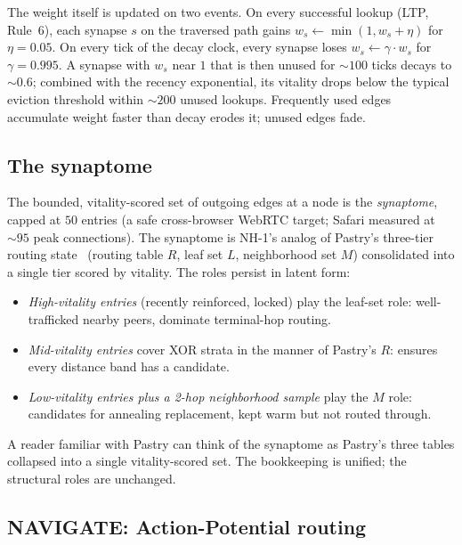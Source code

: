\documentclass[conference]{IEEEtran}
\newcommand{\nhone}{NH-1\xspace}
\begin{document}
The weight itself is updated on two events. On every successful lookup
(LTP, Rule~6), each synapse $s$ on the traversed path gains $w_s
\leftarrow \min(1, w_s + \eta)$ for $\eta = 0.05$. On every tick of the
decay clock, every synapse loses $w_s \leftarrow \gamma \cdot w_s$ for
$\gamma = 0.995$. A synapse with $w_s$ near $1$ that is then unused for
$\sim\!100$ ticks decays to $\sim\!0.6$; combined with the recency
exponential, its vitality drops below the typical eviction threshold
within $\sim\!200$ unused lookups. Frequently used edges accumulate
weight faster than decay erodes it; unused edges fade.

\subsection{The synaptome}
\label{sec:nh1-synaptome}

The bounded, vitality-scored set of outgoing edges at a node is the
\emph{synaptome}, capped at $50$ entries (a safe cross-browser WebRTC
target; Safari measured at $\sim\!95$ peak connections). The synaptome is
\nhone's analog of Pastry's three-tier routing
state~\cite{rowstron2001pastry} (routing table $R$, leaf set $L$,
neighborhood set $M$) consolidated into a single tier scored by vitality.
The roles persist in latent form:

\begin{itemize}
\item \emph{High-vitality entries} (recently reinforced, locked) play the
leaf-set role: well-trafficked nearby peers, dominate terminal-hop routing.
\item \emph{Mid-vitality entries} cover XOR strata in the manner of
Pastry's $R$: ensures every distance band has a candidate.
\item \emph{Low-vitality entries plus a 2-hop neighborhood sample} play the
$M$ role: candidates for annealing replacement, kept warm but not routed
through.
\end{itemize}

\noindent
A reader familiar with Pastry can think of the synaptome as Pastry's three
tables collapsed into a single vitality-scored set. The bookkeeping is
unified; the structural roles are unchanged.

\subsection{NAVIGATE: Action-Potential routing}
\label{sec:nh1-navigate}
\end{document}
